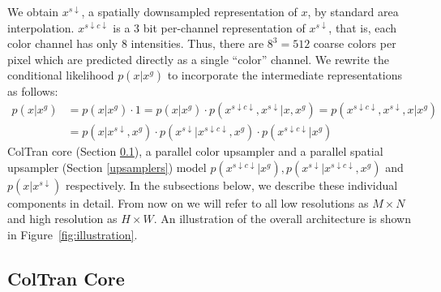 \documentclass{article} \usepackage{iclr2021_conference,times}
\newcommand{\da}{{\scriptscriptstyle\downarrow}}
\begin{document}
We obtain $x^{s\da}$, a spatially downsampled representation of $x$, by standard area interpolation. $x^{s\da c\da}$ is a 3 bit per-channel representation of $x^{s\da}$, that is, each color channel has only 8 intensities. Thus, there are $8^3=512$ coarse colors per pixel which are predicted directly as a single ``color'' channel. We rewrite the conditional likelihood $p(x | x^g)$ to incorporate the intermediate representations as follows:
\begin{align}
p(x| x^g) &= p(x| x^g) \cdot 1 = p(x| x^g) \cdot p(x^{s\da c\da}, x^{s\da} | x, x^g) = p(x^{s\da c\da}, x^{s\da}, x | x^g) \\
              &= p(x | x^{s\da}, x^g) \cdot p(x^{s\da} | x^{s\da c\da}, x^g) \cdot p(x^{s\da c\da}| x^g)
\end{align}
ColTran core (Section \ref{cat}), a parallel color upsampler and a parallel spatial upsampler (Section \ref{upsamplers}) model $p(x^{s\da c\da}| x^g), p(x^{s\da} | x^{s\da c\da}, x^g)$ and $p(x | x^{s\da})$ respectively. In the subsections below, we describe these individual components in detail. From now on we will refer to all low resolutions as $M \times N$ and high resolution as $H \times W$. An illustration of the overall architecture is shown in Figure~\ref{fig:illustration}.





\subsection{ColTran Core}
\label{cat}
\end{document}
